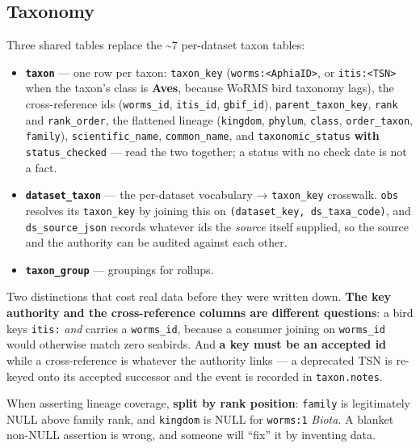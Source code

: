 \documentclass[
  letterpaper,
  DIV=11,
  numbers=noendperiod]{scrreprt}
\providecommand{\tightlist}{%
  \setlength{\itemsep}{0pt}\setlength{\parskip}{0pt}}
\begin{document}
\subsection{Taxonomy}\label{taxonomy}

Three shared tables replace the \textasciitilde7 per-dataset taxon
tables:

\begin{itemize}
\tightlist
\item
  \textbf{\texttt{taxon}} --- one row per taxon: \texttt{taxon\_key}
  (\texttt{worms:\textless{}AphiaID\textgreater{}}, or
  \texttt{itis:\textless{}TSN\textgreater{}} when the taxon's class is
  \textbf{Aves}, because WoRMS bird taxonomy lags), the cross-reference
  ids (\texttt{worms\_id}, \texttt{itis\_id}, \texttt{gbif\_id}),
  \texttt{parent\_taxon\_key}, \texttt{rank} and \texttt{rank\_order},
  the flattened lineage (\texttt{kingdom}, \texttt{phylum},
  \texttt{class}, \texttt{order\_taxon}, \texttt{family}),
  \texttt{scientific\_name}, \texttt{common\_name}, and
  \texttt{taxonomic\_status} \textbf{with} \texttt{status\_checked} ---
  read the two together; a status with no check date is not a fact.
\item
  \textbf{\texttt{dataset\_taxon}} --- the per-dataset vocabulary →
  \texttt{taxon\_key} crosswalk. \texttt{obs} resolves its
  \texttt{taxon\_key} by joining this on
  \texttt{(dataset\_key,\ ds\_taxa\_code)}, and
  \texttt{ds\_source\_json} records whatever ids the \emph{source}
  itself supplied, so the source and the authority can be audited
  against each other.
\item
  \textbf{\texttt{taxon\_group}} --- groupings for rollups.
\end{itemize}

Two distinctions that cost real data before they were written down.
\textbf{The key authority and the cross-reference columns are different
questions}: a bird keys \texttt{itis:} \emph{and} carries a
\texttt{worms\_id}, because a consumer joining on \texttt{worms\_id}
would otherwise match zero seabirds. And \textbf{a key must be an
accepted id} while a cross-reference is whatever the authority links ---
a deprecated TSN is re-keyed onto its accepted successor and the event
is recorded in \texttt{taxon.notes}.

When asserting lineage coverage, \textbf{split by rank position}:
\texttt{family} is legitimately NULL above family rank, and
\texttt{kingdom} is NULL for \texttt{worms:1} \emph{Biota}. A blanket
non-NULL assertion is wrong, and someone will ``fix'' it by inventing
data.
\end{document}

